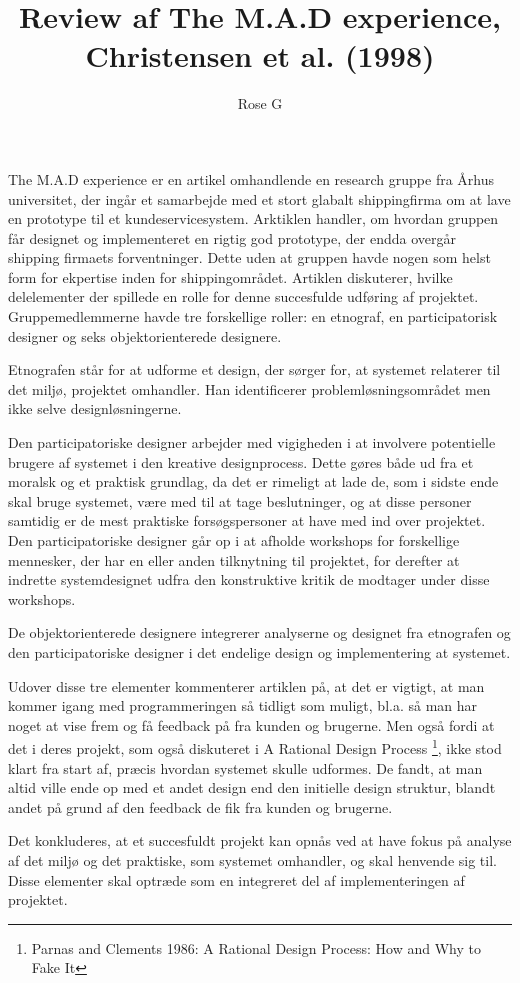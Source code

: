 \documentclass[a4paper]{article}
\title{Review af The M.A.D experience, Christensen et al. (1998)}
\author{Rose G}
\begin{document}
\maketitle


The M.A.D experience er en artikel omhandlende en research gruppe fra Århus universitet, der  ingår et samarbejde med et stort glabalt shippingfirma om at lave en prototype til et kundeservicesystem. 
Arktiklen handler, om hvordan gruppen får designet og implementeret en rigtig god prototype, der endda overgår shipping firmaets forventninger. Dette uden at gruppen havde nogen som helst form for ekpertise inden for shippingområdet.
Artiklen diskuterer, hvilke delelementer der spillede en rolle for denne succesfulde udføring af projektet.
Gruppemedlemmerne havde tre forskellige roller: en etnograf, en participatorisk designer og seks objektorienterede designere. 

Etnografen står for at udforme et design, der sørger for, at systemet relaterer til det miljø, projektet omhandler. Han identificerer problemløsningsområdet men ikke selve designløsningerne.

Den participatoriske designer arbejder med vigigheden i at involvere potentielle brugere af systemet i den kreative designprocess. Dette gøres både ud fra et moralsk og et praktisk grundlag, da det er rimeligt at lade de, som i sidste ende skal bruge systemet, være med til at tage beslutninger, og at disse personer samtidig er de mest praktiske forsøgspersoner at have med ind over projektet. 
Den participatoriske designer går op i at afholde workshops for forskellige mennesker, der har en eller anden tilknytning til projektet, for derefter at indrette systemdesignet udfra den konstruktive kritik de modtager under disse workshops.

De objektorienterede designere integrerer analyserne og designet fra etnografen og den participatoriske designer i det endelige design og implementering at systemet.

Udover disse tre elementer kommenterer artiklen på, at det er vigtigt, at man kommer igang med programmeringen så tidligt som muligt, bl.a. så man har noget at vise frem og få feedback på fra kunden og brugerne. Men også fordi at det i deres projekt, som også diskuteret i A Rational Design Process \footnote{Parnas and Clements 1986: A Rational Design Process: How and Why to Fake It }, ikke stod klart fra start af, præcis hvordan systemet skulle udformes. 
De fandt, at man altid ville ende op med et andet design end den initielle design struktur, blandt andet på grund af den feedback de fik fra kunden og brugerne. 

Det konkluderes, at et succesfuldt projekt kan opnås ved at have fokus på analyse af det miljø og det praktiske, som systemet omhandler, og skal henvende sig til. Disse elementer skal optræde som en integreret del af implementeringen af projektet. 
\end{document}
